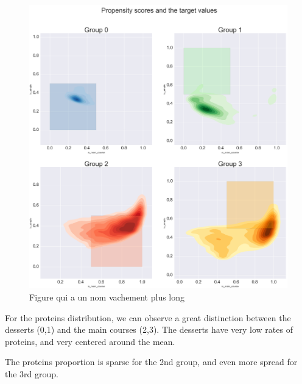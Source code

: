\documentclass[11pt]{article}
\begin{document}
\begin{figure}[!h]
	\includegraphics[width=\columnwidth]{../propensity-r.png}
	\caption{Figure qui a un nom vachement plus long}
	\label{fig:3}
\end{figure}

For the proteins distribution, we can observe a great distinction between the desserts (0,1) and the main courses (2,3). The desserts have very low rates of proteins, and very centered around the mean.

The proteins proportion is sparse for the 2nd group, and even more spread for the 3rd group.
\end{document}
